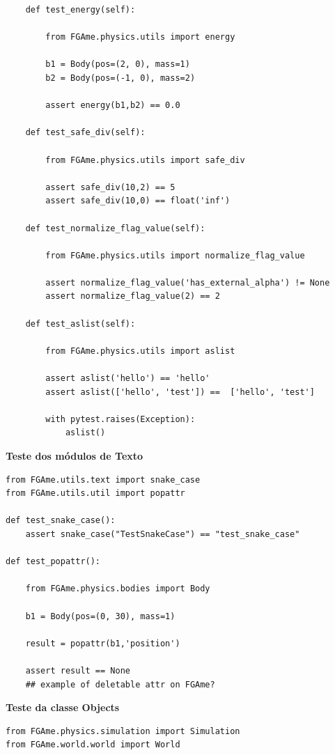 \begin{anexosenv}
\begin{lstlisting}
    def test_energy(self):

        from FGAme.physics.utils import energy

        b1 = Body(pos=(2, 0), mass=1)
        b2 = Body(pos=(-1, 0), mass=2)

        assert energy(b1,b2) == 0.0

    def test_safe_div(self):

        from FGAme.physics.utils import safe_div

        assert safe_div(10,2) == 5
        assert safe_div(10,0) == float('inf')

    def test_normalize_flag_value(self):

        from FGAme.physics.utils import normalize_flag_value

        assert normalize_flag_value('has_external_alpha') != None
        assert normalize_flag_value(2) == 2

    def test_aslist(self):

        from FGAme.physics.utils import aslist

        assert aslist('hello') == 'hello'
        assert aslist(['hello', 'test']) ==  ['hello', 'test']

        with pytest.raises(Exception):
            aslist()
\end{lstlisting}



{\LARGE \textbf{Teste dos módulos de Texto}}

\begin{lstlisting}
from FGAme.utils.text import snake_case
from FGAme.utils.util import popattr

def test_snake_case():
    assert snake_case("TestSnakeCase") == "test_snake_case"

def test_popattr():

	from FGAme.physics.bodies import Body

	b1 = Body(pos=(0, 30), mass=1)

	result = popattr(b1,'position')

	assert result == None 
	## example of deletable attr on FGAme?

\end{lstlisting}


{\LARGE \textbf{Teste da classe Objects}}

\begin{lstlisting}
from FGAme.physics.simulation import Simulation
from FGAme.world.world import World


\end{lstlisting}
\end{anexosenv}

